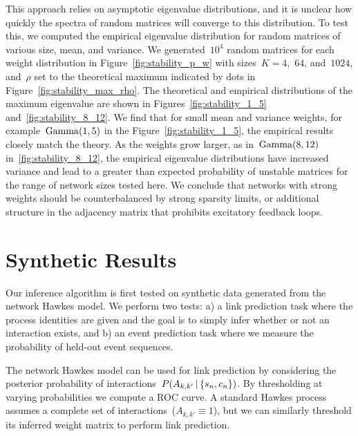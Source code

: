 This approach relies on asymptotic eigenvalue distributions, and it is unclear how quickly the spectra of random matrices will converge to this distribution. To test this, we computed the empirical eigenvalue distribution for random matrices of various size, mean, and variance. We generated~$10^4$ random matrices for each weight distribution in Figure~\ref{fig:stability_p_w} with sizes~$K=4$,~$64$, and~$1024$, and~$\rho$ set to the theoretical maximum indicated by dots in Figure~\ref{fig:stability_max_rho}. The theoretical and empirical distributions of the maximum eigenvalue are shown in Figures~\ref{fig:stability_1_5} and~\ref{fig:stability_8_12}. We find that for small mean and variance weights, for example~$\mathrm{Gamma}(1,5)$ in the Figure~\ref{fig:stability_1_5}, the empirical results closely match the theory. As the weights grow larger, as in~${\mathrm{Gamma}(8,12)}$ in~\ref{fig:stability_8_12}, the empirical eigenvalue distributions have increased variance and lead to a greater than expected probability of unstable matrices for the range of network sizes tested here. We conclude that networks with strong weights should be counterbalanced by strong sparsity limits, or additional structure in the adjacency matrix that prohibits excitatory feedback loops.

\section{Synthetic Results}
\label{sec:synth}
Our inference algorithm is first tested on synthetic data generated from the network Hawkes model. We perform two tests: a) a link prediction task where the process identities are given and the goal is to simply infer whether or not an interaction exists, and b) an event prediction task where we measure the probability of held-out event sequences. 

The network Hawkes model can be used for link prediction by considering the posterior probability of interactions~$P(A_{k,k'}\,|\, \{s_n,c_n\})$. By thresholding at varying probabilities we compute a ROC curve. A standard Hawkes process assumes a complete set of interactions~($A_{k,k'}\equiv 1$), but we can similarly threshold its inferred weight matrix to perform link prediction. 

